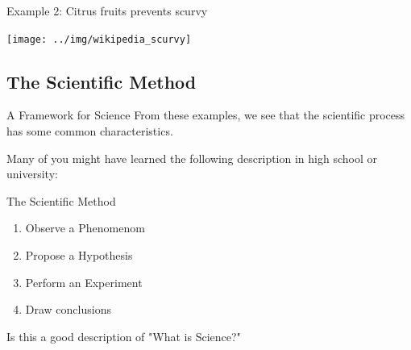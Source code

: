 \begin{frame}{Example 2: Citrus fruits prevents scurvy}
  \begin{center}
    \texttt{[image: ../img/wikipedia\_scurvy]}
  \end{center}
\end{frame}


\subsection{The Scientific Method}

\begin{frame}{A Framework for Science}{}
  From these examples, we see that the scientific process has some common characteristics.\bigskip

  Many of you might have learned the following description in high school or university:

  \begin{block}{The Scientific Method}
    \begin{enumerate}
      \item Observe a Phenomenom
      \item Propose a Hypothesis
      \item Perform an Experiment
      \item Draw conclusions
    \end{enumerate}
  \end{block}\bigskip

  Is this a good description of "What is Science?"
\end{frame}

